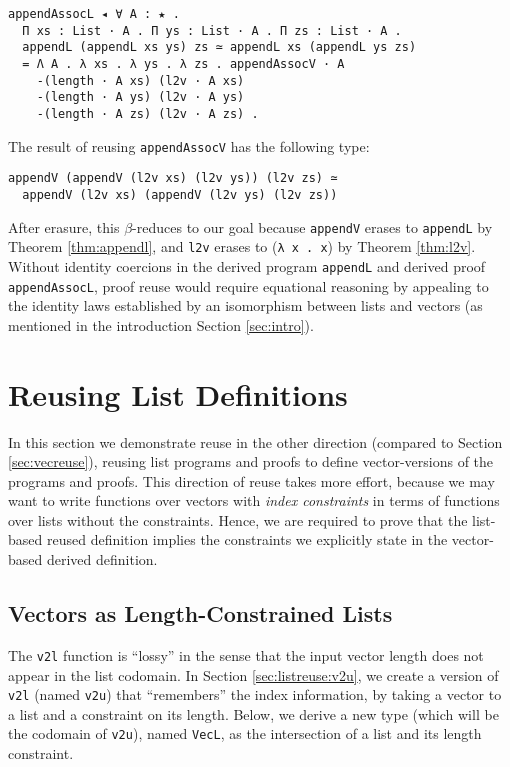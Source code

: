 \documentclass[a4paper,envcountsame,envcountsect]{llncs}
\newcommand{\refsec}[1]{Section \ref{sec:#1}}
\newcommand{\labsec}[1]{\label{sec:#1}}
\newcommand{\refthm}[1]{Theorem \ref{thm:#1}}
\begin{document}
\begin{verbatim}
appendAssocL ◂ ∀ A : ★ .
  Π xs : List · A . Π ys : List · A . Π zs : List · A .
  appendL (appendL xs ys) zs ≃ appendL xs (appendL ys zs)
  = Λ A . λ xs . λ ys . λ zs . appendAssocV · A
    -(length · A xs) (l2v · A xs)
    -(length · A ys) (l2v · A ys)
    -(length · A zs) (l2v · A zs) .
\end{verbatim}

The result of reusing \texttt{appendAssocV} has the following type:
\begin{verbatim}
appendV (appendV (l2v xs) (l2v ys)) (l2v zs) ≃ 
  appendV (l2v xs) (appendV (l2v ys) (l2v zs))
\end{verbatim}

After erasure, this $\beta$-reduces to our goal because
\texttt{appendV} erases to \texttt{appendL} by
\refthm{appendl}, and \texttt{l2v} erases to (\texttt{λ x . x})
by \refthm{l2v}.
Without identity coercions in the derived program \texttt{appendL} and
derived proof \texttt{appendAssocL}, proof reuse would require equational
reasoning by appealing to the identity laws established by an
isomorphism between lists and vectors (as mentioned in the
introduction \refsec{intro}).

\section{Reusing List Definitions}
\labsec{listreuse}

In this section we demonstrate reuse in the other direction
(compared to \refsec{vecreuse}), reusing list programs and proofs to
define vector-versions of the programs and proofs.
This direction of reuse takes more effort, because we may want to write
functions over vectors with \textit{index constraints} in terms of functions
over lists without the constraints. Hence, we are required to prove
that the list-based reused definition implies the constraints we
explicitly state in the vector-based derived definition.

\subsection{Vectors as Length-Constrained Lists}
\labsec{listreuse:vecl}

The \texttt{v2l} function is ``lossy'' in the sense that the input
vector length does not appear in the list codomain.
In \refsec{listreuse:v2u}, we create a version of \texttt{v2l}
(named \texttt{v2u}) that ``remembers'' the index information, by
taking a vector to a list and a constraint on its length. Below, we
derive a new type (which will be the codomain of \texttt{v2u}),
named \texttt{VecL}, as the intersection of a list
and its length constraint.
\end{document}
